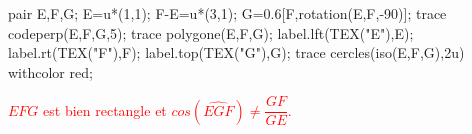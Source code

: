 \begin{corrige}
\begin{minipage}{0.45\linewidth}
        \bigskip
        \begin{Geometrie}
            pair E,F,G;
            E=u*(1,1);
            F-E=u*(3,1);            
            G=0.6[F,rotation(E,F,-90)];
            trace codeperp(E,F,G,5);
            trace polygone(E,F,G);
            label.lft(TEX("E"),E);
            label.rt(TEX("F"),F);
            label.top(TEX("G"),G);
            trace cercles(iso(E,F,G),2u) withcolor red;
        \end{Geometrie}
        \textcolor{red}{$EFG$ est bien rectangle et $cos(\widehat{EGF})\neq\dfrac{GF}{GE}$.}
    \end{minipage}
\end{corrige}

